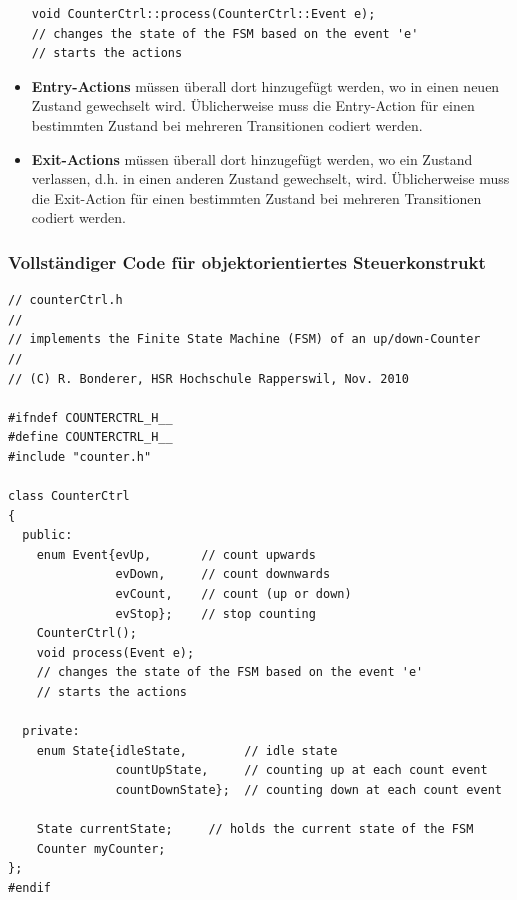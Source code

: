 \begin{itemize}
\begin{lstlisting}[style=Cpp]
void CounterCtrl::process(CounterCtrl::Event e); 
// changes the state of the FSM based on the event 'e' 
// starts the actions
\end{lstlisting}

\item \textbf{Entry-Actions} müssen überall dort hinzugefügt werden, wo in einen
neuen Zustand gewechselt wird. Üblicherweise muss die Entry-Action für einen
bestimmten Zustand bei mehreren Transitionen codiert werden.
\item \textbf{Exit-Actions} müssen überall dort hinzugefügt werden, wo ein
Zustand verlassen, d.h. in einen anderen Zustand gewechselt, wird. Üblicherweise
muss die Exit-Action für einen bestimmten Zustand bei mehreren Transitionen
codiert werden.
\end{itemize}

\subsubsection{Vollständiger Code für objektorientiertes Steuerkonstrukt}
\label{subsec:oo_code}
\begin{lstlisting}[style=Cpp]
// counterCtrl.h
//
// implements the Finite State Machine (FSM) of an up/down-Counter
//
// (C) R. Bonderer, HSR Hochschule Rapperswil, Nov. 2010

#ifndef COUNTERCTRL_H__
#define COUNTERCTRL_H__
#include "counter.h"

class CounterCtrl
{
  public:
    enum Event{evUp,       // count upwards
               evDown,     // count downwards
               evCount,    // count (up or down)
               evStop};    // stop counting
    CounterCtrl();
    void process(Event e);
    // changes the state of the FSM based on the event 'e'
    // starts the actions

  private:
    enum State{idleState,        // idle state
               countUpState,     // counting up at each count event
               countDownState};  // counting down at each count event

    State currentState;     // holds the current state of the FSM
    Counter myCounter;
};
#endif
\end{lstlisting}

